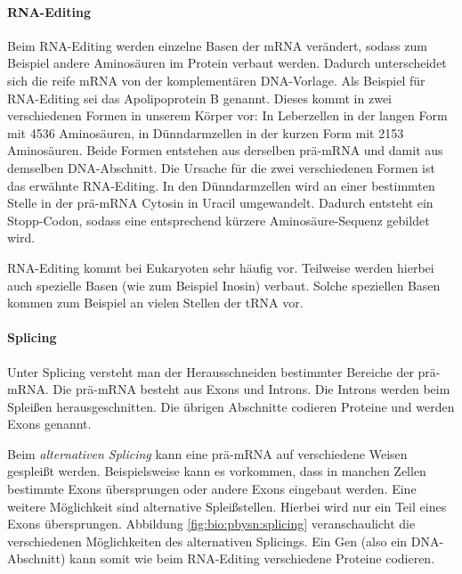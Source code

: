 \paragraph{RNA-Editing}
Beim RNA-Editing werden einzelne Basen der mRNA verändert, sodass zum Beispiel andere Aminosäuren im Protein verbaut werden. Dadurch unterscheidet sich die reife mRNA von der komplementären DNA-Vorlage. Als Beispiel für RNA-Editing sei das Apolipoprotein B genannt. Dieses kommt in zwei verschiedenen Formen in unserem Körper vor: In Leberzellen in der langen Form mit 4536 Aminosäuren, in Dünndarmzellen in der kurzen Form mit 2153 Aminosäuren. Beide Formen entstehen aus derselben prä-mRNA und damit aus demselben DNA-Abschnitt. Die Ursache für die zwei verschiedenen Formen ist das erwähnte RNA-Editing. In den Dünndarmzellen wird an einer bestimmten Stelle in der prä-mRNA Cytosin in Uracil umgewandelt. Dadurch entsteht ein Stopp-Codon, sodass eine entsprechend kürzere Aminosäure-Sequenz gebildet wird. 

RNA-Editing kommt bei Eukaryoten sehr häufig vor. Teilweise werden hierbei auch spezielle Basen (wie zum Beispiel Inosin) verbaut. Solche speziellen Basen kommen zum Beispiel an vielen Stellen der tRNA vor.

\paragraph{Splicing}
Unter Splicing versteht man der Herausschneiden bestimmter Bereiche der prä-mRNA. Die prä-mRNA besteht aus Exons und Introns. Die Introns werden beim Spleißen herausgeschnitten. Die übrigen Abschnitte codieren Proteine und werden Exons genannt.

Beim \emph{alternativen Splicing} kann eine prä-mRNA auf verschiedene Weisen gespleißt werden. Beispielsweise kann es vorkommen, dass in manchen Zellen bestimmte Exons übersprungen oder andere Exons eingebaut werden. Eine weitere Möglichkeit sind alternative Spleißstellen. Hierbei wird nur ein Teil eines Exons übersprungen. Abbildung \ref{fig:bio:pbysn:splicing} veranschaulicht die verschiedenen Möglichkeiten des alternativen Splicings. Ein Gen (also ein DNA-Abschnitt) kann somit wie beim RNA-Editing verschiedene Proteine codieren. 

